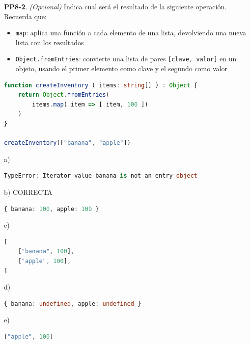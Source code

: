 \textbf{PP8-2}. \emph{(Opcional)} Indica cual será el resultado de la siguiente operación. Recuerda que:

\begin{itemize}
\item \texttt{map}: aplica una función a cada elemento de una lista, devolviendo una nueva lista con los resultados
\item \texttt{Object.\allowbreak{}fromEntries}: convierte una lista de pares \texttt{[clave, valor]} en un objeto, usando el primer elemento como clave y el segundo como valor
\end{itemize}

\begin{bloquecodigo}
\begin{lstlisting}[language=TypeScript]
function createInventory ( items: string[] ) : Object {
    return Object.fromEntries(
        items.map( item => [ item, 100 ])
    )
}

createInventory(["banana", "apple"])
\end{lstlisting}
\end{bloquecodigo}

\begin{opcion}{a)}
\begin{lstlisting}[language=TypeScript]
TypeError: Iterator value banana is not an entry object
\end{lstlisting}
\end{opcion}

\begin{opcion}{b)}
CORRECTA
\begin{lstlisting}[language=TypeScript]
{ banana: 100, apple: 100 }
\end{lstlisting}
\end{opcion}

\begin{opcion}{c)}
\begin{lstlisting}[language=TypeScript]
[
    ["banana", 100],
    ["apple", 100],
]
\end{lstlisting}
\end{opcion}

\begin{opcion}{d)}
\begin{lstlisting}[language=TypeScript]
{ banana: undefined, apple: undefined }
\end{lstlisting}
\end{opcion}

\begin{opcion}{e)}
\begin{lstlisting}[language=TypeScript]
["apple", 100]
\end{lstlisting}
\end{opcion}

